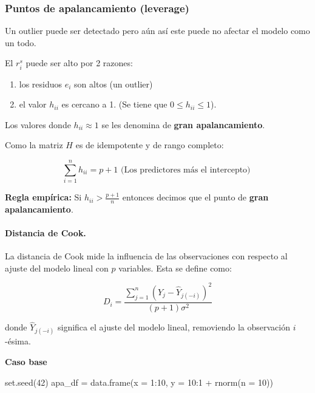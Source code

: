 \documentclass[
  12pt,
]{book}
\newenvironment{Shaded}{\begin{snugshade}}{\end{snugshade}}
\newcommand{\AttributeTok}[1]{\textcolor[rgb]{0.77,0.63,0.00}{#1}}
\newcommand{\DecValTok}[1]{\textcolor[rgb]{0.00,0.00,0.81}{#1}}
\newcommand{\FunctionTok}[1]{\textcolor[rgb]{0.00,0.00,0.00}{#1}}
\newcommand{\NormalTok}[1]{#1}
\newcommand{\OtherTok}[1]{\textcolor[rgb]{0.56,0.35,0.01}{#1}}
\newcommand{\SpecialCharTok}[1]{\textcolor[rgb]{0.00,0.00,0.00}{#1}}
\providecommand{\tightlist}{%
  \setlength{\itemsep}{0pt}\setlength{\parskip}{0pt}}
\theoremstyle{definition}
\theoremstyle{definition}
\theoremstyle{definition}
\theoremstyle{definition}
\theoremstyle{remark}
\begin{document}
\hypertarget{puntos-de-apalancamiento-leverage}{%
\subsubsection{Puntos de apalancamiento (leverage)}\label{puntos-de-apalancamiento-leverage}}

Un outlier puede ser detectado pero aún así este puede no afectar el modelo como un todo.

El \(r_{i}^s\) puede ser alto por 2 razones:

\begin{enumerate}
\def\labelenumi{\arabic{enumi}.}
\tightlist
\item
  los residuos \(e_i\) son altos (un outlier)
\item
  el valor \(h_{ii}\) es cercano a 1. (Se tiene que \(0\leq h_{ii}\leq 1\)).
\end{enumerate}

Los valores donde \(h_{ii}\approx 1\) se les denomina de \textbf{gran apalancamiento}.

Como la matriz \(H\) es de idempotente y de rango completo:

\begin{equation*}
\sum_{i=1}^{n} h_{ii} = p +1 \text{  (Los predictores más el intercepto)   }
\end{equation*}

\textbf{Regla empírica:} Si \(h_{ii}>\frac{p+1}{n}\) entonces decimos que el punto de \textbf{gran apalancamiento}.

\hypertarget{distancia-de-cook.}{%
\paragraph{Distancia de Cook.}\label{distancia-de-cook.}}

La distancia de Cook mide la influencia de las observaciones con respecto al ajuste del modelo lineal con \(p\) variables. Esta se define como:

\[
\displaystyle D_i = \frac{\sum\limits_{j=1}^n (\hat{Y}_j - \hat{Y}_{j(-i)})^2}{(p+1) \sigma^2}
\]

donde \(\hat{Y}_{j(-i)}\) significa el ajuste del modelo lineal, removiendo la observación \(i\)-ésima.

\textbf{Caso base}

\begin{Shaded}
\begin{Highlighting}[]
\FunctionTok{set.seed}\NormalTok{(}\DecValTok{42}\NormalTok{)}
\NormalTok{apa\_df }\OtherTok{=} \FunctionTok{data.frame}\NormalTok{(}\AttributeTok{x =} \DecValTok{1}\SpecialCharTok{:}\DecValTok{10}\NormalTok{, }\AttributeTok{y =} \DecValTok{10}\SpecialCharTok{:}\DecValTok{1} \SpecialCharTok{+} \FunctionTok{rnorm}\NormalTok{(}\AttributeTok{n =} \DecValTok{10}\NormalTok{))}
\end{Highlighting}
\end{Shaded}
\end{document}
